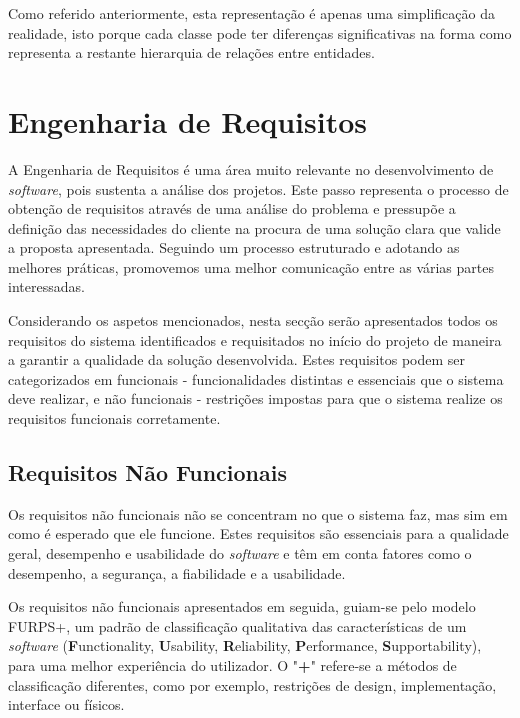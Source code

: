 Como referido anteriormente, esta representação é apenas uma simplificação da realidade, isto
porque cada classe pode ter diferenças significativas na forma como representa a restante
hierarquia de relações entre entidades.

\section{Engenharia de Requisitos}

A Engenharia de Requisitos é uma área muito relevante no desenvolvimento de \textit{software}, pois 
sustenta a análise dos projetos. Este passo representa o processo de obtenção de requisitos através 
de uma análise do problema e pressupõe a definição das necessidades do cliente na procura de uma 
solução clara que valide a proposta apresentada. Seguindo um processo estruturado e adotando as 
melhores práticas, promovemos uma melhor comunicação entre as várias partes interessadas.

Considerando os aspetos mencionados, nesta secção serão apresentados todos os 
requisitos do sistema identificados e requisitados no início do projeto de maneira a garantir a 
qualidade da solução desenvolvida. Estes requisitos podem ser categorizados em funcionais - 
funcionalidades distintas e essenciais que o sistema deve realizar, e não funcionais - 
restrições impostas para que o sistema realize os requisitos funcionais corretamente.

\subsection{Requisitos Não Funcionais}

Os requisitos não funcionais não se concentram no que o sistema faz, mas sim em como é esperado que
ele funcione. Estes requisitos são essenciais para a qualidade geral, desempenho e usabilidade do 
\textit{software} e têm em conta fatores como o desempenho, a segurança, a fiabilidade e a 
usabilidade.

Os requisitos não funcionais apresentados em seguida, guiam-se pelo modelo FURPS+, um padrão de 
classificação qualitativa das características de um \textit{software} (\textbf{F}unctionality, 
\textbf{U}sability, \textbf{R}eliability, \textbf{P}erformance, \textbf{S}upportability), para uma 
melhor experiência do utilizador. O "\textbf{+}" refere-se a métodos de classificação diferentes, 
como por exemplo, restrições de design, implementação, interface ou físicos.

